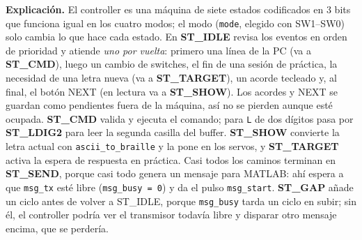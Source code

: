 \documentclass[11pt]{article}
\begin{document}
\begin{center}
{}
\end{center}

\vspace{4pt}
\noindent\textbf{\color{tinta}Explicación.}
El controller es una máquina de siete estados codificados en 3 bits que funciona igual
en los cuatro modos; el modo (\texttt{mode}, elegido con SW1--SW0) solo cambia lo que
hace cada estado. En \textbf{ST\_IDLE} revisa los eventos en orden de prioridad y atiende
\emph{uno por vuelta}: primero una línea de la PC (va a \textbf{ST\_CMD}), luego un cambio
de switches, el fin de una sesión de práctica, la necesidad de una letra nueva (va a
\textbf{ST\_TARGET}), un acorde tecleado y, al final, el botón NEXT (en lectura va a
\textbf{ST\_SHOW}). Los acordes y NEXT se guardan como pendientes fuera de la máquina,
así no se pierden aunque esté ocupada. \textbf{ST\_CMD} valida y ejecuta el comando;
para \texttt{L} de dos dígitos pasa por \textbf{ST\_LDIG2} para leer la segunda casilla
del buffer. \textbf{ST\_SHOW} convierte la letra actual con \texttt{ascii\_to\_braille} y la
pone en los servos, y \textbf{ST\_TARGET} activa la espera de respuesta en práctica. Casi
todos los caminos terminan en \textbf{ST\_SEND}, porque casi todo genera un mensaje para
MATLAB: ahí espera a que \texttt{msg\_tx} esté libre (\texttt{msg\_busy = 0}) y da el pulso
\texttt{msg\_start}. \textbf{ST\_GAP} añade un ciclo antes de volver a ST\_IDLE, porque
\texttt{msg\_busy} tarda un ciclo en subir; sin él, el controller podría ver el transmisor
todavía libre y disparar otro mensaje encima, que se perdería.
\end{document}
